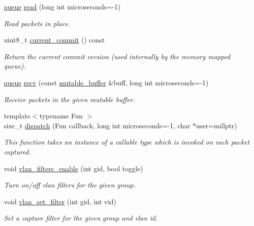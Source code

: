 \begin{DoxyCompactItemize}
\hyperlink{classnet_1_1queue}{queue} \hyperlink{classnet_1_1pfq_aa5f1f823256285ebd45d47e454ce7bd4}{read} (long int microseconds=-\/1)
\begin{DoxyCompactList}\small\item\em Read packets in place. \end{DoxyCompactList}\item 
uint8\-\_\-t \hyperlink{classnet_1_1pfq_a31aa0b2b6221c4b70ade77ad00e2761b}{current\-\_\-commit} () const 
\begin{DoxyCompactList}\small\item\em Return the current commit version (used internally by the memory mapped queue). \end{DoxyCompactList}\item 
\hyperlink{classnet_1_1queue}{queue} \hyperlink{classnet_1_1pfq_a858804361efdbd149b838940319be49c}{recv} (const \hyperlink{namespacenet_ac0df3fa0efbc044d8a2441906e8f61cb}{mutable\-\_\-buffer} \&buff, long int microseconds=-\/1)
\begin{DoxyCompactList}\small\item\em Receive packets in the given mutable buffer. \end{DoxyCompactList}\item 
{\footnotesize template$<$typename Fun $>$ }\\size\-\_\-t \hyperlink{classnet_1_1pfq_af96974c25658386b3ad994b0de43f4b2}{dispatch} (Fun callback, long int microseconds=-\/1, char $\ast$user=nullptr)
\begin{DoxyCompactList}\small\item\em This function takes an instance of a callable type which is invoked on each packet captured. \end{DoxyCompactList}\item 
void \hyperlink{classnet_1_1pfq_ae70dad67b0f243e604ffc6d94a888454}{vlan\-\_\-filters\-\_\-enable} (int gid, bool toggle)
\begin{DoxyCompactList}\small\item\em Turn on/off vlan filters for the given group. \end{DoxyCompactList}\item 
void \hyperlink{classnet_1_1pfq_ae659846711122122b7a086f70e4b2375}{vlan\-\_\-set\-\_\-filter} (int gid, int vid)
\begin{DoxyCompactList}\small\item\em Set a capture filter for the given group and vlan id. \end{DoxyCompactList}\item 

\end{DoxyCompactItemize}

